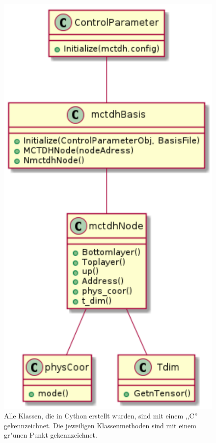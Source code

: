 \begin{figure}
    \centering
    \includegraphics[scale=0.6]{figures/sequenceDiagram}
    \caption{Alle Klassen, die in Cython erstellt wurden, sind mit einem ,,C'' gekennzeichnet. Die jeweiligen Klassenmethoden sind mit einem
    gr"unen Punkt gekennzeichnet.}\label{fig:uml_Cython}
\end{figure}








